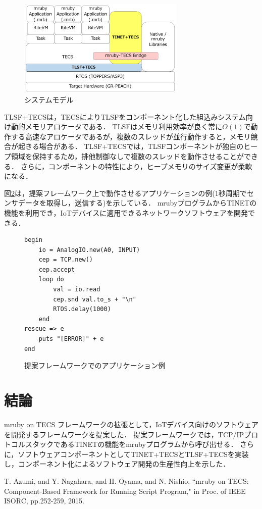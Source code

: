 \documentclass[a4j,10pt,twocolumn]{../styles/utf8/abstract}
\begin{document}
\begin{figure}[h]
    \centering
    \includegraphics[width=8cm,clip]{SystemModel.pdf}
    \vspace{-0.2cm}
    \caption{システムモデル}
    \vspace{-0.4cm}
    \label{fig:SystemModel}
\end{figure}

TLSF+TECSは，TECSによりTLSFをコンポーネント化した組込みシステム向け動的メモリアロケータである．
TLSFはメモリ利用効率が良く常に$O(1)$で動作する高速なアロケータであるが，複数のスレッドが並行動作すると，メモリ競合が起きる場合がある．
TLSF+TECSでは，TLSFコンポーネントが独自のヒープ領域を保持するため，排他制御なしで複数のスレッドを動作させることができる．
さらに，コンポーネントの特性により，ヒープメモリのサイズ変更が柔軟になる．

図\ref{src:Application}は，提案フレームワーク上で動作させるアプリケーションの例(1秒周期でセンサデータを取得し，送信する)を示している．
mrubyプログラムからTINETの機能を利用でき，IoTデバイスに適用できるネットワークソフトウェアを開発できる．

\begin{figure}[t]
\centering
\begin{lstlisting}
begin
    io = AnalogIO.new(A0, INPUT)
    cep = TCP.new()
    cep.accept
    loop do
        val = io.read
        cep.snd val.to_s + "\n"
        RTOS.delay(1000)
    end
rescue => e
    puts "[ERROR]" + e
end
\end{lstlisting}
\vspace{-0.2cm}
\caption{提案フレームワークでのアプリケーション例}  
\vspace{-0.7cm}
\label{src:Application}
\end{figure}

\section{結論}

mruby on TECS フレームワークの拡張として，IoTデバイス向けのソフトウェアを開発するフレームワークを提案した．
提案フレームワークでは，TCP/IPプロトコルスタックであるTINETの機能をmrubyプログラムから呼び出せる．
さらに，ソフトウェアコンポーネントとしてTINET+TECSとTLSF+TECSを実装し，コンポーネント化によるソフトウェア開発の生産性向上を示した．

%
%
\begin{thebibliography}{1}
    T. Azumi, and Y. Nagahara, and H. Oyama, and N. Nishio, 
    ``mruby on TECS: Component-Based Framework for Running Script Program," 
    in Proc. of IEEE ISORC, 
    pp.252-259, 
    2015. 
\end{thebibliography}
\newpage
\pagebreak
\end{document}
